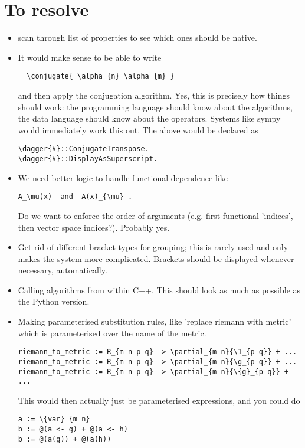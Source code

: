 \documentclass[11pt]{article}
\begin{document}
\section{To resolve}

\begin{itemize}
\item scan through list of properties to see which ones should be
native.

\item It would make sense to be able to write
\begin{lstlisting}
  \conjugate{ \alpha_{n} \alpha_{m} }
\end{lstlisting}
and then apply the conjugation algorithm. Yes, this is precisely how
things should work: the programming language should know about the
algorithms, the data language should know about the operators. Systems
like sympy would immediately work this out. The above would be
declared as
\begin{lstlisting}
\dagger{#}::ConjugateTranspose.
\dagger{#}::DisplayAsSuperscript.
\end{lstlisting}
\item We need better logic to handle functional dependence like
\begin{lstlisting}
A_\mu(x)  and  A(x)_{\mu} .
\end{lstlisting}
Do we want to enforce the order of arguments (e.g. first functional
'indices', then vector space indices?).  Probably yes.

\item Get rid of different bracket types for grouping; this is rarely used and only
makes the system more complicated. Brackets should be displayed
whenever necessary, automatically. 

\item Calling algorithms from within C++. This should look as much as possible
as the Python version.

\item Making parameterised substitution rules, like 'replace riemann with metric' 
which is parameterised over the name of the metric.
\begin{lstlisting}
riemann_to_metric := R_{m n p q} -> \partial_{m n}{\1_{p q}} + ...
riemann_to_metric := R_{m n p q} -> \partial_{m n}{\g_{p q}} + ...
riemann_to_metric := R_{m n p q} -> \partial_{m n}{\{g}_{p q}} + ...
\end{lstlisting}
This would then actually just be parameterised expressions, and you could do
\begin{lstlisting}
a := \{var}_{m n}
b := @(a <- g) + @(a <- h)
b := @(a(g)) + @(a(h))
\end{lstlisting}


\end{itemize}
\end{document}
